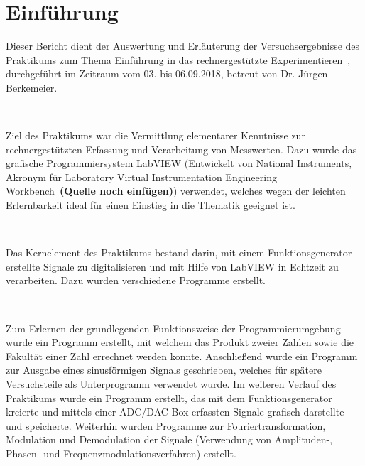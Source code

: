 \section{Einführung}

	
Dieser Bericht dient der Auswertung und Erläuterung der Versuchsergebnisse des Praktikums zum Thema \glqq Einführung in das rechnergestützte Experimentieren\grqq\ , durchgeführt im Zeitraum vom 03. bis 06.09.2018, betreut von Dr. Jürgen Berkemeier.
	
\
	
Ziel des Praktikums war die Vermittlung elementarer Kenntnisse zur rechnergestützten Erfassung und Verarbeitung von Messwerten. Dazu wurde das grafische Programmiersystem LabVIEW (Entwickelt von National Instruments, Akronym für \glqq Laboratory Virtual Instrumentation Engineering Workbench\grqq\ \textbf{(Quelle noch einfügen)}) verwendet, welches wegen der leichten Erlernbarkeit ideal für einen Einstieg in die Thematik geeignet ist.

\

Das Kernelement des Praktikums bestand darin, mit einem Funktionsgenerator erstellte Signale zu digitalisieren und mit Hilfe von LabVIEW in Echtzeit zu verarbeiten. Dazu wurden verschiedene Programme erstellt.

\

Zum Erlernen der grundlegenden Funktionsweise der Programmierumgebung wurde ein Programm erstellt, mit welchem das Produkt zweier Zahlen sowie die Fakultät einer Zahl errechnet werden konnte. Anschließend wurde ein Programm zur Ausgabe eines sinusförmigen Signals geschrieben, welches für spätere Versuchsteile als Unterprogramm verwendet wurde. Im weiteren Verlauf des Praktikums wurde ein Programm erstellt, das mit dem Funktionsgenerator kreierte und mittels einer ADC/DAC-Box erfassten Signale grafisch darstellte und speicherte. Weiterhin wurden Programme zur Fouriertransformation, Modulation und Demodulation der Signale (Verwendung von Amplituden-, Phasen- und Frequenzmodulationsverfahren) erstellt.
